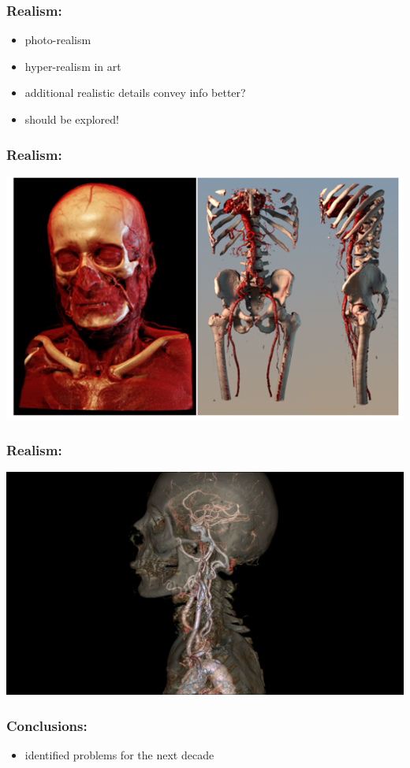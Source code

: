 \documentclass{beamer}
\begin{document}
\begin{frame}
	\frametitle{Realism:}
	\begin{itemize}
		\item photo-realism
		\item hyper-realism in art
		\item additional realistic details convey info better?
		\item should be explored!
	\end{itemize}
\end{frame}

\begin{frame}
	\frametitle{Realism:}
	\includegraphics[width=\textwidth]{images/medical_visualisation}
\end{frame}

\begin{frame}
	\frametitle{Realism:}
	\includegraphics[width=\textwidth]{images/realistic_transparent}
\end{frame}

\begin{frame}
	\frametitle{Conclusions:}
	\begin{itemize}
		\item identified problems for the next decade
	\end{itemize}
\end{frame}
\end{document}
